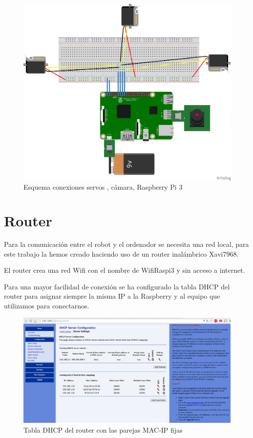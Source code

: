 \documentclass[twoside, 12pt]{epstfg}
\begin{document}
\begin{figure}[h]
	\centerline{
		\mbox{\includegraphics[width=.95\textwidth]{images/EsquemaServos.png}}
	}
	\caption{Esquema conexiones servos , cámara, Raspberry Pi 3}
\end{figure}


\section{Router}
Para la comunicación entre el robot y el ordenador se necesita una red local,  para este trabajo la hemos creado haciendo uso de un router inalámbrico Xavi7968.

El router crea una red Wifi con el nombre de WifiRaspi3 y sin acceso a internet.

Para una mayor facilidad de conexión se ha configurado la tabla DHCP del router para asignar siempre la misma IP a la Raspberry y al equipo que utilizamos para conectarnos.

\begin{figure}[h]
	\centerline{
		\mbox{\includegraphics[width=.95\textwidth]{images/TablaDHCP2.png}}
	}
	\caption{Tabla DHCP del router con las parejas MAC-IP fijas}
\end{figure}
\end{document}
